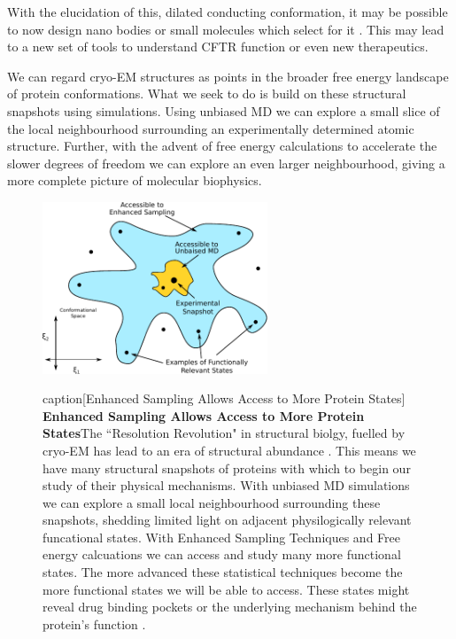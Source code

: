 With the elucidation of this, dilated conducting conformation, it may be possible to now design nano bodies or small molecules which select for it \cite{hutter2019}. This may lead to a new set of tools to understand CFTR function or even new therapeutics. 

We can regard cryo-EM structures as points in the broader free energy landscape of protein conformations. What we seek to do is build on these structural snapshots using simulations. Using unbiased MD we can explore a small slice of the local neighbourhood surrounding an experimentally determined atomic structure. Further, with the advent of free energy calculations to accelerate the slower degrees of freedom we can explore an even larger neighbourhood, giving a more complete picture of molecular biophysics. 

\begin{figure}
	\label{Enhanced_sampling_framework}
	\begin{center}
		\includegraphics[width=0.6\textwidth]{figures/opening/MD_accessibility.pdf}
	\end{center}
	\captionsetup{singlelinecheck = false, justification=raggedright}
	caption[Enhanced Sampling Allows Access to More Protein States] {\textbf{Enhanced Sampling Allows Access to More Protein States}}{The ``Resolution Revolution" in structural biolgy, fuelled by cryo-EM has lead to an era of structural abundance \cite{kuhlbrandt2014}. This means we have many structural snapshots of proteins with which to begin our study of their physical mechanisms. With unbiased MD simulations we can explore a small local neighbourhood surrounding these snapshots, shedding limited light on adjacent physilogically relevant funcational states. With Enhanced Sampling Techniques and Free energy calcuations we can access and study many more functional states. The more advanced these statistical techniques become the more functional states we will be able to access. These states might reveal drug binding pockets or the underlying mechanism behind the protein's function \cite{}. }
\end{figure}

